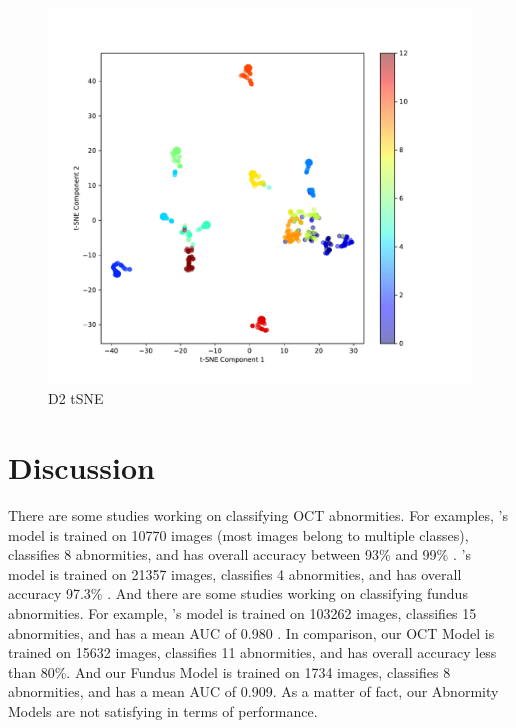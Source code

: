 \documentclass{article}
\begin{document}
	\begin{figure}[htbp]
		\centering
		\includegraphics[width=\linewidth]{Figs/diagnosis2_tSNE.pdf}
		\caption{D2 tSNE}
		\vspace{0.3cm}
		\label{fig:D2_tSNE}
	\end{figure}
	
	\section{Discussion}
	
	There are some studies working on classifying OCT abnormities.  For examples, \citeauthor{leandro2023oct}'s model is trained on 10770 images (most images belong to multiple classes), classifies 8 abnormities, and has overall accuracy between 93\% and 99\% \autocite{leandro2023oct}. \citeauthor{li2019deep}'s model is trained on 21357 images, classifies 4 abnormities, and has overall accuracy 97.3\% \autocite{li2019deep}.  And there are some studies working on classifying fundus abnormities.  For example,  	\citeauthor{Son2023}'s model is trained on 103262 images, classifies 15 abnormities, and has a mean AUC of 0.980 \autocite{Son2023}. In comparison, our OCT Model is trained on 15632 images, classifies 11 abnormities, and has overall accuracy less than 80\%.  And our Fundus Model is trained on 1734 images, classifies 8 abnormities, and has a mean AUC of 0.909. As a matter of fact, our Abnormity Models are not satisfying in terms of performance.
	
\end{document}
